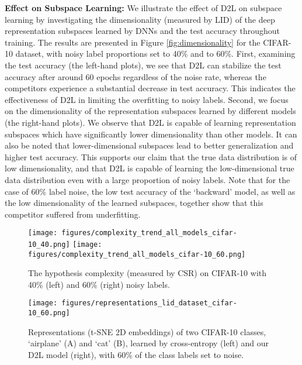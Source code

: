 \documentclass{article}
\begin{document}
\textbf{Effect on Subspace Learning:}
We illustrate the effect of D2L on subspace learning by investigating the dimensionality (measured by LID) of the deep representation subspaces learned by DNNs and the test accuracy throughout training. The results are presented in Figure \ref{fig:dimensionality} for the CIFAR-10 dataset, with noisy label proportions set to 40\% and to 60\%. First, examining the test accuracy (the left-hand plots), we see that D2L can stabilize the test accuracy after around 60 epochs regardless of the noise rate, whereas the competitors experience a substantial decrease in test accuracy. This indicates the effectiveness of D2L in limiting the overfitting to noisy labels. Second, we focus on the dimensionality of the representation subspaces learned by different models (the right-hand plots). We observe that D2L is capable of learning representation subspaces which have significantly lower dimensionality than other models. It can also be noted that lower-dimensional subspaces lead to better generalization and higher test accuracy. This supports our claim that the true data distribution is of low dimensionality, and that D2L is capable of learning the low-dimensional true data distribution even with a large proportion of noisy labels. Note that for the case of 60\% label noise, the low test accuracy of the `backward' model, as well as the low dimensionality of the learned subspaces, together show that this competitor suffered from underfitting.



\begin{figure}[!ht]
\centering
\small
\texttt{[image: figures/complexity\_trend\_all\_models\_cifar-10\_40.png]}
\texttt{[image: figures/complexity\_trend\_all\_models\_cifar-10\_60.png]}
\caption{The hypothesis complexity (measured by CSR) on CIFAR-10 with 40\% (left) and 60\% (right) noisy labels.}
\label{fig:complexity}
\end{figure}

\begin{figure}[!t]
\centering
\small
\texttt{[image: figures/representations\_lid\_dataset\_cifar-10\_60.png]}
\caption{Representations (t-SNE 2D embeddings) of two CIFAR-10 classes, `airplane' (A) and `cat' (B), learned by cross-entropy (left) and our D2L model (right), with 60\% of the class labels set to noise.}
\label{fig:representation}
\vspace{-0.2in}
\end{figure}
\end{document}
